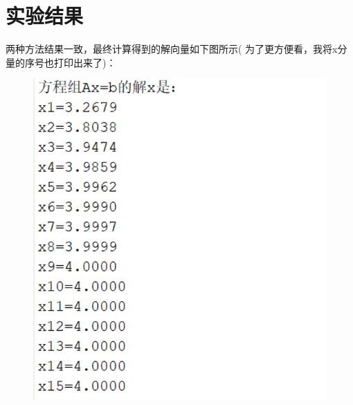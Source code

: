 \documentclass{LabReport}
\begin{document}
\section{实验结果}
两种方法结果一致，最终计算得到的解向量如下图所示({\color{red} 为了更方便看，我将x分量的序号也打印出来了})：
\begin{figure}[h!] %
	\begin{minipage}[t]{0.48\textwidth} %
		\centering
		\includegraphics[width=\linewidth]{figures/3} %
		\label{fig:left_image} %
	\end{minipage}
	\hfill %
	\begin{minipage}[t]{0.41\textwidth} %
		\centering

\end{minipage}
\end{figure}
\end{document}
